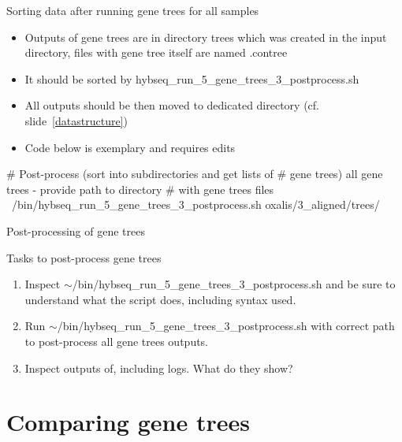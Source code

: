 \documentclass[compress, ucs, xelatex, 11pt, xcolor=x11names, aspectratio=169,
	hyperref={
		bookmarks=true,
		unicode=true,
		colorlinks=true,
		pdftitle={HybSeq course},
		plainpages=false,
		pdfauthor={Vojtech Zeisek},
		pdfsubject={Practical processing of HybSeq target enrichment sequencing data on computing grids like MetaCentrum},
		pdfcreator={XeLaTeX},
		pdfkeywords={BASH, command line, GNU, HybSeq, Linux, MetaCentrum, sequencing shell, target enrichment},
		linkcolor=Cyan2, %
		anchorcolor=Firebrick2, %
		citecolor=Firebrick2, %
		filecolor=Firebrick2, %
		menucolor=Firebrick2, %
		urlcolor=Chartreuse2, %
		pdftex},
	url={hyphens, lowtilde} %
	]{beamer}
\renewcommand{\texttt}[1]{\colorbox{Snow4}{{\ttfamily #1}}}
\renewcommand{\alert}[1]{\textcolor{OrangeRed2}{#1}}
\begin{document}
\begin{frame}[fragile]{Sorting data after running gene trees for all samples}
	\begin{itemize}
		\item Outputs of gene trees are in directory \texttt{trees} which was created in the input directory, files with gene tree itself are named \texttt{*.contree}
		\item It should be sorted by \texttt{hybseq\_run\_5\_gene\_trees\_3\_postprocess.sh}
		\item All outputs should be then moved to dedicated directory (cf. slide~\ref{datastructure})
		\item \alert{Code below is exemplary and requires edits}
	\end{itemize}
	\begin{bashcode}
    # Post-process (sort into subdirectories and get lists of
    # gene trees) all gene trees - provide path to directory
    # with gene trees files
    ~/bin/hybseq_run_5_gene_trees_3_postprocess.sh oxalis/3_aligned/trees/
	\end{bashcode}
\end{frame}

\begin{frame}{Post-processing of gene trees}
	\begin{exampleblock}{Tasks to post-process gene trees}
		\begin{enumerate}
			\item Inspect \texttt{$\sim$/bin/hybseq\_run\_5\_gene\_trees\_3\_postprocess.sh} and be sure to understand what the script does, including syntax used.
			\item Run \texttt{$\sim$/bin/hybseq\_run\_5\_gene\_trees\_3\_postprocess.sh}  with correct path to post-process all gene trees outputs.
			\item Inspect outputs of, including logs. What do they show?
		\end{enumerate}
	\end{exampleblock}
\end{frame}

\section{Comparing gene trees}
\end{document}
